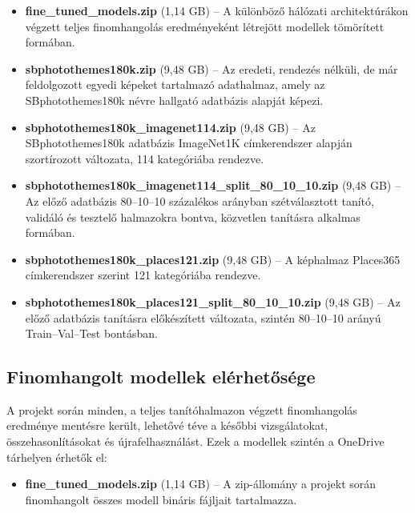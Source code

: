        \begin{itemize}
            \item \textbf{fine\_tuned\_models.zip} (1,14 GB) – A különböző hálózati architektúrákon végzett teljes finomhangolás eredményeként létrejött modellek tömörített formában.
            
            \item \textbf{sbphotothemes180k.zip} (9,48 GB) – Az eredeti, rendezés nélküli, de már feldolgozott egyedi képeket tartalmazó adathalmaz, amely az SBphotothemes180k névre hallgató adatbázis alapját képezi.
            
            \item \textbf{sbphotothemes180k\_imagenet114.zip} (9,48 GB) – Az SBphotothemes180k adatbázis ImageNet1K címkerendszer alapján szortírozott változata, 114 kategóriába rendezve.
            
            \item \textbf{sbphotothemes180k\_imagenet114\_split\_80\_10\_10.zip} (9,48 GB) – Az előző adatbázis 80–10–10 százalékos arányban szétválasztott tanító, validáló és tesztelő halmazokra bontva, közvetlen tanításra alkalmas formában.
            
            \item \textbf{sbphotothemes180k\_places121.zip} (9,48 GB) – A képhalmaz Places365 címkerendszer szerint 121 kategóriába rendezve.
            
            \item \textbf{sbphotothemes180k\_places121\_split\_80\_10\_10.zip} (9,48 GB) – Az előző adatbázis tanításra előkészített változata, szintén 80–10–10 arányú Train–Val–Test bontásban.
        \end{itemize}
        
        \subsection{Finomhangolt modellek elérhetősége}
        
        A projekt során minden, a teljes tanítóhalmazon végzett finomhangolás eredménye mentésre került, lehetővé téve a későbbi vizsgálatokat, összehasonlításokat és újrafelhasználást. Ezek a modellek szintén a OneDrive tárhelyen érhetők el:
        
        \begin{itemize}
            \item \textbf{fine\_tuned\_models.zip} (1,14 GB) – A zip-állomány a projekt során finomhangolt összes modell bináris fájljait tartalmazza.
        \end{itemize}
        
